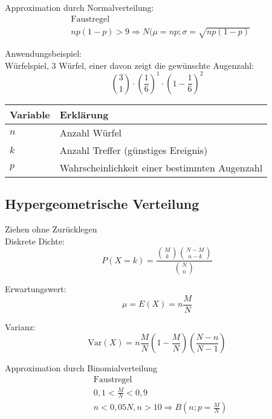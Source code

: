 Approximation durch Normalverteilung:
\begin{align*}
	& \text{Faustregel} \\
	& np(1-p) > 9 \Rightarrow N(\mu = np; \sigma = \sqrt{np(1-p)} 
\end{align*}

Anwendungsbeispiel:\\
Würfelspiel, 3 Würfel, einer davon zeigt die gewünschte Augenzahl:\\
\begin{equation}
	\binom{3}{1}\cdot\left(\frac{1}{6}\right)^1\cdot\left(1-\frac{1}{6}\right)^2
\end{equation}

\begin{table}[h]
	\begin{tabular}{ll}
		Variable & Erklärung\\
		\toprule
		$n$ & Anzahl Würfel\\
		$k$ & Anzahl Treffer (günstiges Ereignis)\\
		$p$ & Wahrscheinlichkeit einer bestimmten Augenzahl
	\end{tabular}
\end{table}

\clearpage

\subsection{Hypergeometrische Verteilung}
\large{Ziehen ohne Zurücklegen}\\
Diskrete Dichte:
\begin{equation}
	P(X=k)=\frac{\binom{M}{k}\binom{N-M}{n-k}}{\binom{N}{n}}
\end{equation}

Erwartungswert:
\begin{equation}
	\mu = E(X)= n\frac{M}{N}
\end{equation}

Varianz:
\begin{equation}
	\mathrm{Var}(X)=n\frac{M}{N}\left(1-\frac{M}{N}\right)\left(\frac{N-n}{N-1}\right)
\end{equation}

Approximation durch Binomialverteilung
\begin{align*}
	& \text{Faustregel} \\
	& 0,1 < \frac{M}{N} < 0,9 \\
	& n < 0,05N, n >10 \Rightarrow B\left(n;p = \frac{M}{N}\right) 
\end{align*}

